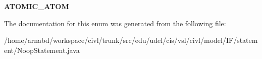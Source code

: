 \begin{DoxyCompactItemize}
\item 
\hypertarget{enumedu_1_1udel_1_1cis_1_1vsl_1_1civl_1_1model_1_1IF_1_1statement_1_1NoopStatement_1_1NoopKind_aea57247b42d3b0c5782d24b22881c394}{}{\bfseries A\+T\+O\+M\+I\+C\+\_\+\+A\+T\+O\+M}\label{enumedu_1_1udel_1_1cis_1_1vsl_1_1civl_1_1model_1_1IF_1_1statement_1_1NoopStatement_1_1NoopKind_aea57247b42d3b0c5782d24b22881c394}

\end{DoxyCompactItemize}


The documentation for this enum was generated from the following file\+:\begin{DoxyCompactItemize}
\item 
/home/arnabd/workspace/civl/trunk/src/edu/udel/cis/vsl/civl/model/\+I\+F/statement/Noop\+Statement.\+java\end{DoxyCompactItemize}

